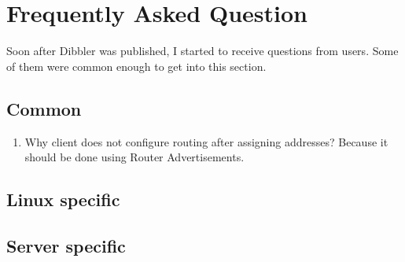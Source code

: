 \section{Frequently Asked Question}

Soon after Dibbler was published, I started to receive questions from
users. Some of them were common enough to get into this section.

\subsection{Common}

\begin{enumerate}
\item Why client does not configure routing after assigning addresses?
Because it should be done using Router Advertisements.

\end{enumerate}

\subsection{Linux specific}


\subsection{Server specific}
